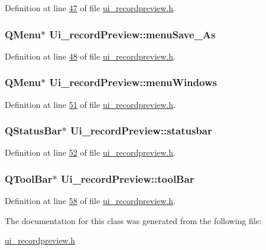 Definition at line \hyperlink{a00140_source_l00047}{47} of file \hyperlink{a00140_source}{ui\+\_\+recordpreview.\+h}.

\hypertarget{a00081_aaf69c873ec3bf0ea397829122ca4a224}{
\subsubsection[{menu\+Save\+\_\+\+As}]{\setlength{\rightskip}{0pt plus 5cm}Q\+Menu$\ast$ Ui\+\_\+record\+Preview\+::menu\+Save\+\_\+\+As}}\label{a00081_aaf69c873ec3bf0ea397829122ca4a224}


Definition at line \hyperlink{a00140_source_l00048}{48} of file \hyperlink{a00140_source}{ui\+\_\+recordpreview.\+h}.

\hypertarget{a00081_afd93511da273fc2c6a88472d154cb176}{
\subsubsection[{menu\+Windows}]{\setlength{\rightskip}{0pt plus 5cm}Q\+Menu$\ast$ Ui\+\_\+record\+Preview\+::menu\+Windows}}\label{a00081_afd93511da273fc2c6a88472d154cb176}


Definition at line \hyperlink{a00140_source_l00051}{51} of file \hyperlink{a00140_source}{ui\+\_\+recordpreview.\+h}.

\hypertarget{a00081_a5573ce6bc38b919d995ee7927b66c223}{
\subsubsection[{statusbar}]{\setlength{\rightskip}{0pt plus 5cm}Q\+Status\+Bar$\ast$ Ui\+\_\+record\+Preview\+::statusbar}}\label{a00081_a5573ce6bc38b919d995ee7927b66c223}


Definition at line \hyperlink{a00140_source_l00052}{52} of file \hyperlink{a00140_source}{ui\+\_\+recordpreview.\+h}.

\hypertarget{a00081_ac94509c2cd16337592e1634b0f2a6020}{
\subsubsection[{tool\+Bar}]{\setlength{\rightskip}{0pt plus 5cm}Q\+Tool\+Bar$\ast$ Ui\+\_\+record\+Preview\+::tool\+Bar}}\label{a00081_ac94509c2cd16337592e1634b0f2a6020}


Definition at line \hyperlink{a00140_source_l00058}{58} of file \hyperlink{a00140_source}{ui\+\_\+recordpreview.\+h}.



The documentation for this class was generated from the following file\+:\begin{DoxyCompactItemize}
\item 
\hyperlink{a00140}{ui\+\_\+recordpreview.\+h}\end{DoxyCompactItemize}
